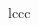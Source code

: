\documentclass[12pt]{ucsddissertation}
\begin{document}
\begin{CJK*}{UTF8}{gbsn}
\begin{deluxetable}{lccc}

\end{deluxetable}
\end{CJK*}
\end{document}
